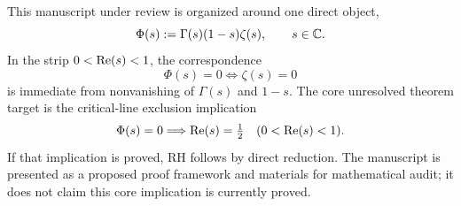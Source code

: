 This manuscript under review is organized around one direct object,
\[
\Phi(s):=\Gamma(s)(1-s)\zeta(s),\qquad s\in\mathbb{C}.
\]
In the strip $0<\operatorname{Re}(s)<1$, the correspondence
\[
\Phi(s)=0\iff\zeta(s)=0
\]
is immediate from nonvanishing of $\Gamma(s)$ and $1-s$.
The core unresolved theorem target is the critical-line exclusion implication
\[
\Phi(s)=0\Longrightarrow \operatorname{Re}(s)=\tfrac12
\quad (0<\operatorname{Re}(s)<1).
\]
If that implication is proved, RH follows by direct reduction.
The manuscript is presented as a proposed proof framework and materials for mathematical audit; it does not claim this core implication is currently proved.
